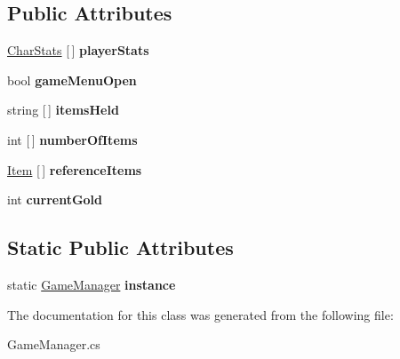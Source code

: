 \subsection*{Public Attributes}
\begin{DoxyCompactItemize}
\item 
\mbox{\label{class_game_manager_a5b2262f99eebec9593b69d0cd5b65309}} 
\mbox{\hyperlink{class_char_stats}{Char\+Stats}} \mbox{[}$\,$\mbox{]} {\bfseries player\+Stats}
\item 
\mbox{\label{class_game_manager_a7ecae09a6734f387c27fea6555d9ee2d}} 
bool {\bfseries game\+Menu\+Open}
\item 
\mbox{\label{class_game_manager_a55fdf0466ffcc9810f0ece91a87e731c}} 
string \mbox{[}$\,$\mbox{]} {\bfseries items\+Held}
\item 
\mbox{\label{class_game_manager_a7690200420f66182a2d8062fb8657f47}} 
int \mbox{[}$\,$\mbox{]} {\bfseries number\+Of\+Items}
\item 
\mbox{\label{class_game_manager_aad5772b315d1a7b4867f35cd8d7edd67}} 
\mbox{\hyperlink{class_item}{Item}} \mbox{[}$\,$\mbox{]} {\bfseries reference\+Items}
\item 
\mbox{\label{class_game_manager_ac224eb77868e482582a965e008f9b6f4}} 
int {\bfseries current\+Gold}
\end{DoxyCompactItemize}
\subsection*{Static Public Attributes}
\begin{DoxyCompactItemize}
\item 
\mbox{\label{class_game_manager_a7666e8468dac197b9eb32dd32128524f}} 
static \mbox{\hyperlink{class_game_manager}{Game\+Manager}} {\bfseries instance}
\end{DoxyCompactItemize}


The documentation for this class was generated from the following file\+:\begin{DoxyCompactItemize}
\item 
Game\+Manager.\+cs\end{DoxyCompactItemize}
